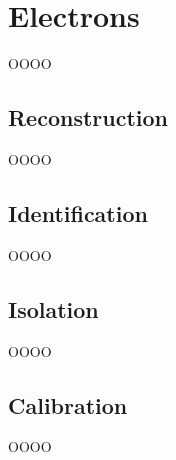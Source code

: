 \section{Electrons}
\label{heading:Chapter6-section2-1}

OOOO

\subsection{Reconstruction}
\label{heading:Chapter6-section2-2}

OOOO

\subsection{Identification}
\label{heading:Chapter6-section2-3}

OOOO

\subsection{Isolation}
\label{heading:Chapter6-section2-4}

OOOO

\subsection{Calibration}
\label{heading:Chapter6-section2-5}

OOOO

